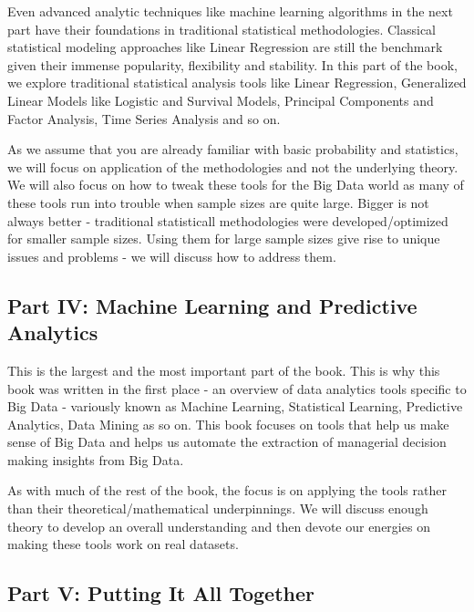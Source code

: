\documentclass[]{krantz}
\begin{document}
Even advanced analytic techniques like machine learning algorithms in
the next part have their foundations in traditional statistical
methodologies. Classical statistical modeling approaches like Linear
Regression are still the benchmark given their immense popularity,
flexibility and stability. In this part of the book, we explore
traditional statistical analysis tools like Linear Regression,
Generalized Linear Models like Logistic and Survival Models, Principal
Components and Factor Analysis, Time Series Analysis and so on.

As we assume that you are already familiar with basic probability and
statistics, we will focus on application of the methodologies and not
the underlying theory. We will also focus on how to tweak these tools
for the Big Data world as many of these tools run into trouble when
sample sizes are quite large. Bigger is not always better - traditional
statisticall methodologies were developed/optimized for smaller sample
sizes. Using them for large sample sizes give rise to unique issues and
problems - we will discuss how to address them.

\subsection*{Part IV: Machine Learning and Predictive
Analytics}\label{part-iv-machine-learning-and-predictive-analytics}

This is the largest and the most important part of the book. This is why
this book was written in the first place - an overview of data analytics
tools specific to Big Data - variously known as Machine Learning,
Statistical Learning, Predictive Analytics, Data Mining as so on. This
book focuses on tools that help us make sense of Big Data and helps us
automate the extraction of managerial decision making insights from Big
Data.

As with much of the rest of the book, the focus is on applying the tools
rather than their theoretical/mathematical underpinnings. We will
discuss enough theory to develop an overall understanding and then
devote our energies on making these tools work on real datasets.

\subsection*{Part V: Putting It All
Together}\label{part-v-putting-it-all-together}
\end{document}
